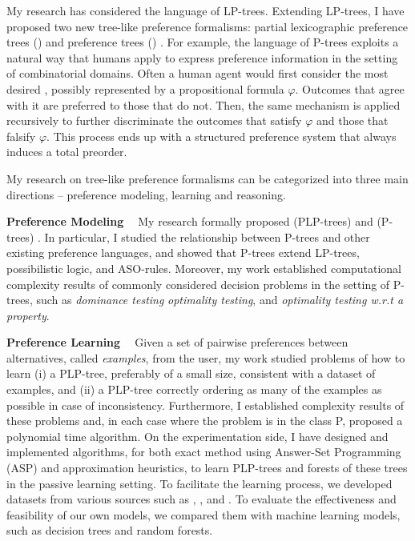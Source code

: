 My research has considered the language of LP-trees.
Extending LP-trees, I have proposed two new tree-like preference formalisms:
partial lexicographic preference trees () \cite{conf/aaai15/LiuT}
and preference trees () \cite{fraser1994,liu2014preference,conf/adt15/liuT}.
For example, the language of P-trees exploits a natural way that humans apply to
express preference information in the setting of combinatorial domains.
Often a human agent would first consider the most desired ,
possibly represented by a propositional formula $\varphi$.
Outcomes that agree with it are preferred to those that do not.  
Then, the same mechanism is applied recursively to further discriminate the 
outcomes that satisfy $\varphi$ and those that falsify $\varphi$.
This process ends up with a structured preference system that always
induces a total preorder.

My research on tree-like preference formalisms can be categorized into
three main directions -- preference modeling, learning and reasoning.

\smallskip \noindent \textbf{Preference Modeling \ }
\noindent My research formally proposed 
 (PLP-trees) \cite{conf/aaai15/LiuT} and
 (P-trees) \cite{liu2014preference,conf/adt15/liuT}.
In particular, I studied
the relationship between P-trees and other existing preference languages, and
showed that P-trees extend
LP-trees, possibilistic logic, and ASO-rules.
Moreover, my work established computational complexity results of commonly considered decision
problems in the setting of P-trees, such as \textit{dominance testing} 
\textit{optimality testing}, and
\textit{optimality testing w.r.t a property}.

\smallskip \noindent \textbf{Preference Learning \ }
Given a set of pairwise preferences between alternatives, called \textit{examples}, from the user,
my work \cite{conf/aaai15/LiuT} studied problems of how to learn (i) a PLP-tree, 
preferably of a small size, 
consistent with a dataset of examples, and (ii) a PLP-tree correctly
ordering as many of the examples as possible in case
of inconsistency. Furthermore, I established complexity results
of these problems and, in each case where the problem
is in the class P, proposed a polynomial time algorithm.
On the experimentation side,
I have designed and implemented algorithms, for both exact method using
Answer-Set Programming (ASP) and approximation heuristics, to learn PLP-trees 
and forests of these trees in the passive learning setting.
To facilitate the learning process, we developed datasets
from various sources such as ,
, and .
To evaluate the effectiveness and feasibility of our own models, we 
compared them with machine learning models, such as 
decision trees and random forests.

